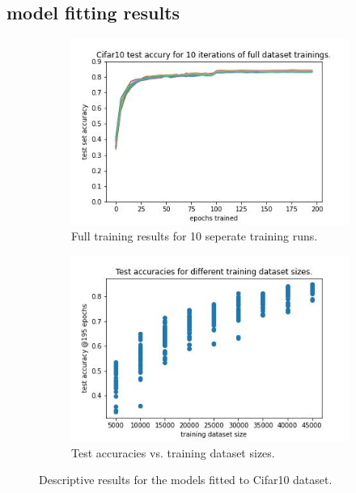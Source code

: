 \documentclass{article} %
\begin{document}
\subsection{model fitting results}



\begin{figure}
    \begin{subfigure}{.5\textwidth}
        \centering
        \includegraphics[width=.8\linewidth]{cifar10/Cifar10_full_dataset_acc_vs_epoch.jpg}
        \caption{Full training results for 10 seperate training runs.}
        \label{fig_full_dataset_epoch_vs_acc}
    \end{subfigure}%
    \begin{subfigure}{.5\textwidth}
        \centering
        \includegraphics[width=.8\linewidth]{cifar10/Cifar10_training_datasetsize_vs_test_acc.jpg}
        \caption{Test accuracies vs. training dataset sizes.}
        \label{fig_traing_subset_size_vs_test_acc}
    \end{subfigure}

    \caption{Descriptive results for the models fitted to Cifar10 dataset.}
    \label{fig:desc_plots_cifar10}
\end{figure}
\end{document}
